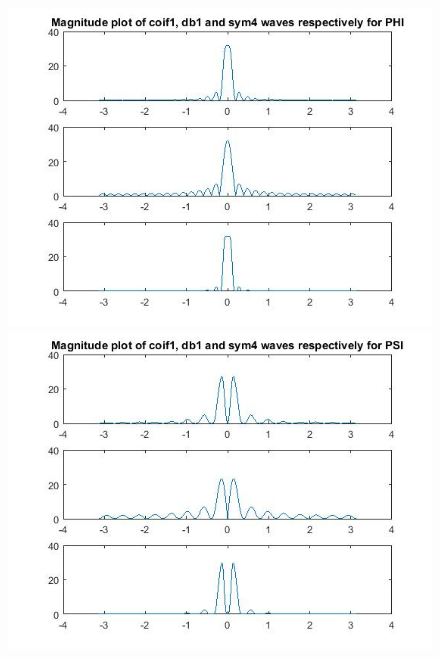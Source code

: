 \documentclass{article}
\begin{document}
\begin{figure}[H]
  \includegraphics[scale=.5]{2_phi}
  \includegraphics[scale=.5]{2_psi}
  \end{figure}
\end{document}
